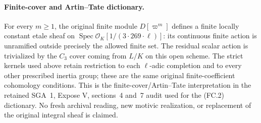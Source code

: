 \paragraph{Finite-cover and Artin--Tate dictionary.}
For every $m\geq1$, the original finite module $D[\varpi^m]$
defines a finite locally constant etale sheaf on
$\operatorname{Spec}\mathcal O_K[1/(3\cdot269\cdot\ell)]$:
its continuous finite action is unramified outside precisely the
allowed finite set.  The residual scalar action is trivialized by
the $C_3$ cover coming from $L/K$ on this open scheme.
The strict kernels used above retain restriction to each
$\ell$-adic completion and to every other prescribed inertia group;
these are the same original finite-coefficient cohomology conditions.
This is the finite-cover/Artin--Tate interpretation in the retained
SGA~1, Expose V, sections~4 and~7 audit used for the (FC.2)
dictionary.  No fresh archival reading, new motivic realization,
or replacement of the original integral sheaf is claimed.

